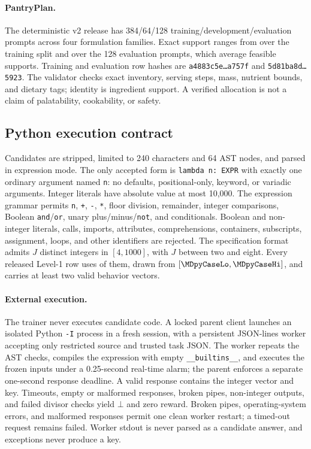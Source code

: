 \documentclass{article}
\newcommand{\1}{\mathbf 1}
\theoremstyle{remark}
\theoremstyle{definition}
\theoremstyle{plain}
\begin{document}
\paragraph{PantryPlan.}
\label{app:data-pantry}
The deterministic v2 release has 384/64/128 training/development/evaluation
prompts across four formulation families. Exact support ranges from
\MDvmPantryTrainRange{} over the training split and \MDvmPantryRange{} over
the 128 evaluation prompts, which
average \MDvmPantryMean{} feasible supports. Training and evaluation row hashes are
\texttt{a4883c5e\ldots a757f} and \texttt{5d81ba8d\ldots5923}.
The validator checks exact inventory, serving steps, mass, nutrient bounds,
and dietary tags; identity is ingredient support. A verified allocation is
not a claim of palatability, cookability, or safety.

\subsection{Python execution contract}
\label{app:python}
\label{app:python-language}

Candidates are stripped, limited to 240 characters and 64 AST nodes, and
parsed in expression mode. The only accepted form is \texttt{lambda n: EXPR}
with exactly one ordinary argument named \texttt{n}: no defaults,
positional-only, keyword, or variadic arguments. Integer literals have
absolute value at most 10,000. The expression grammar permits \texttt{n},
\texttt{+}, \texttt{-}, \texttt{*}, floor division, remainder, integer
comparisons, Boolean \texttt{and}/\texttt{or}, unary plus/minus/\texttt{not},
and conditionals. Boolean and non-integer literals, calls, imports,
attributes, comprehensions, containers, subscripts, assignment, loops, and
other identifiers are rejected. The specification format admits $J$ distinct
integers in $[4,1000]$, with $J$ between two and eight. Every released Level-1
row uses \MDpyCases{} of them, drawn from $[\MDpyCaseLo,\MDpyCaseHi]$, and
carries at least two valid behavior vectors.

\paragraph{External execution.}
\label{app:python-process}
The trainer never executes candidate code. A locked parent client launches
an isolated Python \texttt{-I} process in a fresh session, with a persistent
JSON-lines worker accepting only restricted source and trusted task JSON.
The worker repeats the AST checks, compiles the expression with empty
\texttt{\_\_builtins\_\_}, and executes the frozen inputs under a
0.25-second real-time alarm; the parent enforces a separate one-second
response deadline. A valid response contains the integer vector and key.
Timeouts, empty or malformed responses, broken pipes, non-integer outputs,
and failed divisor checks yield $\bot$ and zero reward. Broken pipes,
operating-system errors, and malformed responses permit one clean worker
restart; a timed-out request remains failed. Worker stdout is never parsed
as a candidate answer, and exceptions never produce a key.
\end{document}
